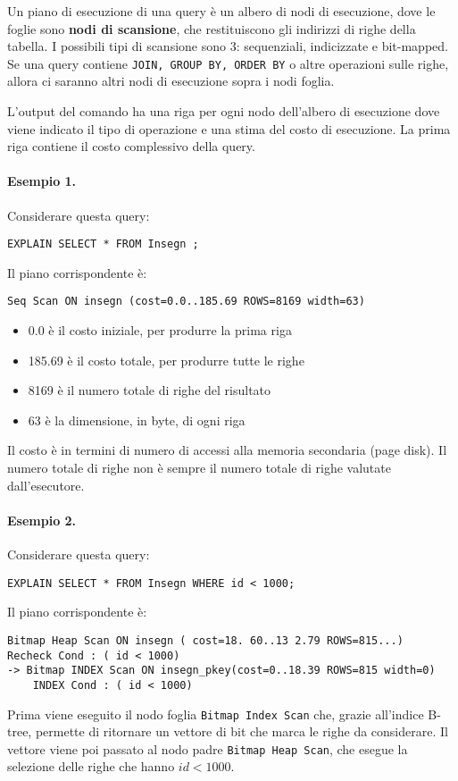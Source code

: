 \documentclass[a4paper, 10pt, titlepage]{article}
\begin{document}
	Un piano di esecuzione di una query è un albero di nodi di esecuzione, dove le foglie sono \textbf{nodi di scansione}, che restituiscono gli indirizzi di righe della tabella. I possibili tipi di scansione sono 3: sequenziali, indicizzate e bit-mapped. Se una query contiene \lstinline|JOIN, GROUP BY, ORDER BY| o altre operazioni sulle righe, allora ci saranno altri nodi di esecuzione sopra i nodi foglia.
	
	L'output del comando ha una riga per ogni nodo dell'albero di esecuzione dove viene indicato il tipo di operazione e una stima del costo di esecuzione. La prima riga contiene il costo complessivo della query.
	
	\paragraph{Esempio 1.}
	Considerare questa query:
	\begin{lstlisting}
EXPLAIN SELECT * FROM Insegn ;
	\end{lstlisting}
	Il piano corrispondente è:
	\begin{lstlisting}
Seq Scan ON insegn (cost=0.0..185.69 ROWS=8169 width=63)
	\end{lstlisting}
	\begin{itemize}
	\item 0.0 è il costo iniziale, per produrre la prima riga 
	\item 185.69 è il costo totale, per produrre tutte le righe
	\item 8169 è il numero totale di righe del risultato
	\item 63 è la dimensione, in byte, di ogni riga
	\end{itemize} 
	Il costo è in termini di numero di accessi alla memoria secondaria (page disk). Il numero totale di righe non è sempre il numero totale di righe valutate dall’esecutore.\medskip
	
	\paragraph{Esempio 2.} 
	Considerare questa query:
	\begin{lstlisting}
EXPLAIN SELECT * FROM Insegn WHERE id < 1000;
	\end{lstlisting}
	Il piano corrispondente è:
	\begin{lstlisting}
Bitmap Heap Scan ON insegn ( cost=18. 60..13 2.79 ROWS=815...)
Recheck Cond : ( id < 1000)
-> Bitmap INDEX Scan ON insegn_pkey(cost=0..18.39 ROWS=815 width=0)
	INDEX Cond : ( id < 1000)
	\end{lstlisting}
	Prima viene eseguito il nodo foglia \lstinline|Bitmap Index Scan| che, grazie all'indice B-tree, permette di ritornare un vettore di bit che marca le righe da considerare. Il vettore viene poi passato al nodo padre \lstinline|Bitmap Heap Scan|, che esegue la selezione delle righe che hanno $id < 1000$. \medskip
	
\end{document}
